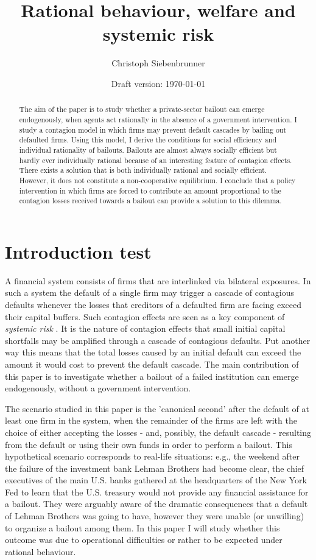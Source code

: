 \documentclass[12pt,a4paper]{article}
\date{Draft version: \today}
\title{Rational behaviour, welfare and systemic risk}
\author{Christoph Siebenbrunner}
\begin{document}
\maketitle

\begin{abstract}
The aim of the paper is to study whether a private-sector bailout can emerge endogenously, when agents act rationally in the absence of a government intervention. I study a contagion model in which firms may prevent default cascades by bailing out defaulted firms. Using this model, I derive the conditions for social efficiency and individual rationality of bailouts. Bailouts are almost always socially efficient but hardly ever individually rational because of an interesting feature of contagion effects. There exists a solution that is both individually rational and socially efficient. However, it does not constitute a non-cooperative equilibrium. I conclude that a policy intervention in which firms are forced to contribute an amount proportional to the contagion losses received towards a bailout can provide a solution to this dilemma.
\end{abstract}

\section{Introduction test}
A financial system consists of firms that are interlinked via bilateral exposures. In such a system the default of a single firm may trigger a cascade of contagious defaults whenever the losses that creditors of a defaulted firm are facing exceed their capital buffers. Such contagion effects are seen as a key component of \textit{systemic risk} \cite[pp. 134-142]{ECB09}. It is the nature of contagion effects that small initial capital shortfalls may be amplified through a cascade of contagious defaults. Put another way this means that the total losses caused by an initial default can exceed the amount it would cost to prevent the default cascade. The main contribution of this paper is to investigate whether a bailout of a failed institution can emerge endogenously, without a government intervention.

The scenario studied in this paper is the 'canonical second' after the default of at least one firm in the system, when the remainder of the firms are left with the choice of either accepting the losses - and, possibly, the default cascade - resulting from the default or using their own funds in order to perform a bailout. This hypothetical scenario corresponds to real-life situations: e.g., the weekend after the failure of the investment bank Lehman Brothers had become clear, the chief executives of the main U.S. banks gathered at the headquarters of the New York Fed to learn that the U.S. treasury would not provide any financial assistance for a bailout. They were arguably aware of the dramatic consequences that a default of Lehman Brothers was going to have, however they were unable (or unwilling) to organize a bailout among them. In this paper I will study whether this outcome was due to operational difficulties or rather to be expected under rational behaviour.
\end{document}
